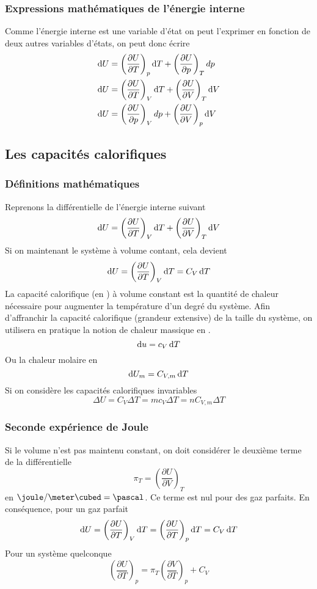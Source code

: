 \subsubsection{Expressions mathématiques de l'énergie interne}
Comme l'énergie interne est une variable d'état on peut l'exprimer en
fonction de deux autres variables d'états, on peut donc écrire
\begin{align*}
  \operatorname{d}\! U & =
  \left(\frac{\partial U}{\partial T}\right)_p \operatorname{d}\! T +
  \left(\frac{\partial U}{\partial p}\right)_T dp\\
  \operatorname{d}\! U & =
  \left(\frac{\partial U}{\partial T}\right)_V \operatorname{d}\! T +
  \left(\frac{\partial U}{\partial V}\right)_T \operatorname{d}\! V\\
  \operatorname{d}\! U & =
  \left(\frac{\partial U}{\partial p}\right)_V dp +
  \left(\frac{\partial U}{\partial V}\right)_p \operatorname{d}\! V
\end{align*}

\subsection{Les capacités calorifiques}
\subsubsection{Définitions mathématiques}
Reprenons la différentielle de l'énergie interne suivant
\[ \operatorname{d}\! U = \left(\frac{\partial U}{\partial T}\right)_V \operatorname{d}\! T +
\left(\frac{\partial U}{\partial V}\right)_T \operatorname{d}\! V \]
Si on maintenant le système à volume contant, cela devient
\[ \operatorname{d}\! U = \left(\frac{\partial U}{\partial T}\right)_V \operatorname{d}\! T = C_V \operatorname{d}\! T \]
La capacité calorifique (en \joule\per\kelvin) à volume constant est
la quantité de chaleur nécessaire pour
augmenter la température d'un degré du système.
Afin d'affranchir la capacité calorifique (grandeur extensive)
de la taille du système, on utilisera en pratique
la notion de chaleur massique en \joule\per\kilogram\cdot\kelvin.
\[ \operatorname{d}\! u = c_V\operatorname{d}\! T \]
Ou la chaleur molaire en \joule\per\mole\cdot\kelvin
\[ \operatorname{d}\! U_m = C_{V,m}\operatorname{d}\! T \]
Si on considère les capacités calorifiques invariables
\[ \Delta U = C_V \Delta T = mc_V\Delta T = nC_{V,m}\Delta T \]

\subsubsection{Seconde expérience de Joule}
Si le volume n'est pas maintenu constant,
on doit considérer le deuxième terme de la différentielle
\[ \pi_T = \left(\frac{\partial U}{\partial V}\right)_T \]
en $\joule/\meter\cubed = \pascal$.
Ce terme est nul pour des gaz parfaits.
En conséquence, pour un gaz parfait
\[ \operatorname{d}\! U = \left(\frac{\partial U}{\partial T}\right)_V \operatorname{d}\! T =
\left(\frac{\partial U}{\partial T}\right)_p \operatorname{d}\! T = C_V\operatorname{d}\! T \]
Pour un système quelconque
\[ \left(\frac{\partial U}{\partial T}\right)_p =
\pi_T \left(\frac{\partial V}{\partial T}\right)_p + C_V \]

